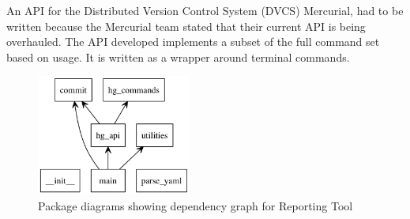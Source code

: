 \documentclass[12pt]{article}
\begin{document}
\noindent
An API for the Distributed Version Control System (DVCS) Mercurial, had to be written because the Mercurial team stated that their current API is being overhauled. The API developed implements a subset of the full command set based on usage. It is written as a wrapper around terminal commands.

\begin{figure}[H]
  \centering
    \includegraphics[height=150px]{figures/packages_reporting_tool.png}
  \caption{Package diagrams showing dependency graph for Reporting Tool}
\end{figure}

\newpage
\end{document}
